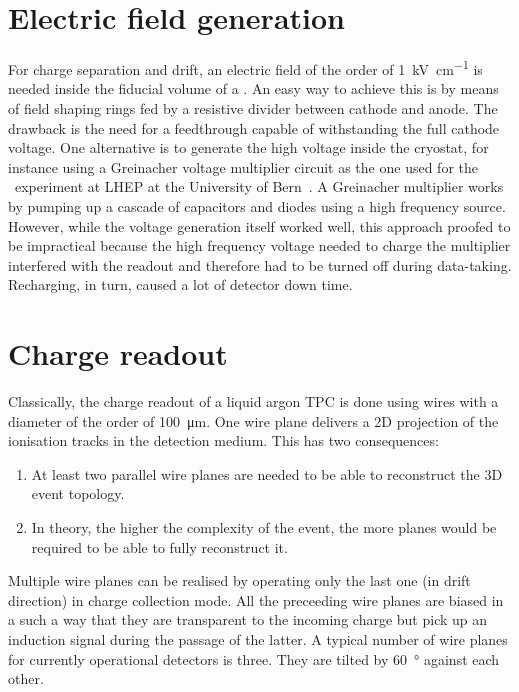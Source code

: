 \section{Electric field generation\label{sec:lartpc_efield}}

For charge separation and drift, an electric field of the order of \SI{1}{\kilo\volt\per\centi\metre} is needed inside the fiducial volume of a \lartpc.
An easy way to achieve this is by means of field shaping rings fed by a resistive divider between cathode and anode.
The drawback is the need for a feedthrough capable of withstanding the full cathode voltage.
One alternative is to generate the high voltage inside the cryostat, for instance using a Greinacher voltage multiplier circuit as the one used for the \AT\ experiment at LHEP at the University of Bern~\cite{AT}.
A Greinacher multiplier works by pumping up a cascade of capacitors and diodes using a high frequency source.
However, while the voltage generation itself worked well, this approach proofed to be impractical because the high frequency voltage needed to charge the multiplier interfered with the readout and therefore had to be turned off during data-taking.
Recharging, in turn, caused a lot of detector down time.


\section{Charge readout\label{sec:lartpc_charge-ro}}

Classically, the charge readout of a liquid argon TPC is done using wires with a diameter of the order of \SI{100}{\micro\metre}.
One wire plane delivers a 2D projection of the ionisation tracks in the detection medium.
This has two consequences:
\begin{enumerate}
	\item At least two parallel wire planes are needed to be able to reconstruct the 3D event topology.
	\item In theory, the higher the complexity of the event, the more planes would be required to be able to fully reconstruct it.
\end{enumerate}
Multiple wire planes can be realised by operating only the last one (in drift direction) in charge collection mode.
All the preceeding wire planes are biased in a such a way that they are transparent to the incoming charge but pick up an induction signal during the passage of the latter.
A typical number of wire planes for currently operational detectors is three.
They are tilted by \SI{60}{\degree} against each other.


